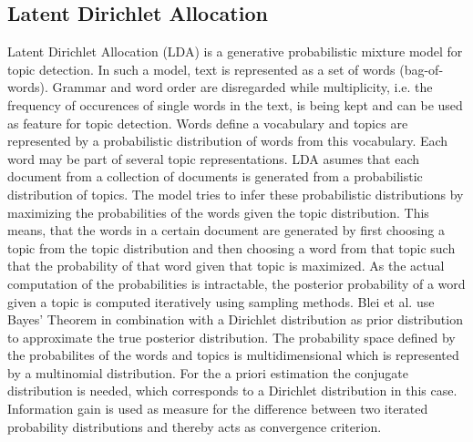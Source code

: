 \subsection{Latent Dirichlet Allocation}\label{sec:LDA}

Latent Dirichlet Allocation (LDA) \cite{Blei:2003:LDA:944919.944937}
 is a generative probabilistic mixture model for topic detection. In such a model, text is represented as a set of words (bag-of-words). Grammar and word order are disregarded while multiplicity, i.e. the frequency of occurences of single words in the text, is being kept and can be used as feature for topic detection. Words define a vocabulary and topics are represented by a probabilistic distribution of words from this vocabulary. Each word may be part of several topic representations. LDA asumes that each document from a collection of documents is generated from a probabilistic distribution of topics. The model tries to infer these probabilistic distributions by maximizing the probabilities of the words given the topic distribution. This means, that the words in a certain document are generated by first choosing a topic from the topic distribution and then choosing a word from that topic such that the probability of that word given that topic is maximized. As the actual computation of the probabilities is intractable, the posterior probability of a word given a topic is computed iteratively using sampling methods. Blei et al. \cite{Blei:2003:LDA:944919.944937} use Bayes' Theorem in combination with a Dirichlet distribution as prior distribution to approximate the true posterior distribution. The probability space defined by the probabilites of the words and topics is multidimensional which is represented by a multinomial distribution. For the a priori estimation the conjugate distribution is needed, which corresponds to a Dirichlet distribution in this case. Information gain is used as measure for the difference between two iterated probability distributions and thereby acts as convergence criterion.

